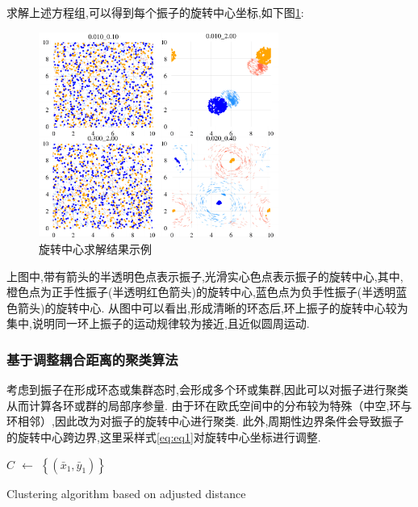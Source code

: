 \documentclass{article}
\begin{document}
求解上述方程组,可以得到每个振子的旋转中心坐标,如下图\ref{fig:fig232.2}:%

\begin{figure}[H]
	\centering
	\includegraphics[width=0.7\textwidth]{./figs/centorsBigGraph_sub.png}
	\vspace{-0.2cm}
	\caption{旋转中心求解结果示例}
	\label{fig:fig232.2}
\end{figure}

上图中,带有箭头的半透明色点表示振子,光滑实心色点表示振子的旋转中心,其中,橙色点为正手性振子(半透明红色箭头)的旋转中心,蓝色点为负手性振子(半透明蓝色箭头)的旋转中心. 从图中可以看出,形成清晰的环态后,环上振子的旋转中心较为集中,说明同一环上振子的运动规律较为接近,且近似圆周运动.



\subsubsection{基于调整耦合距离的聚类算法}\label{clustering}

考虑到振子在形成环态或集群态时,会形成多个环或集群,因此可以对振子进行聚类从而计算各环或群的局部序参量. 由于环在欧氏空间中的分布较为特殊（中空,环与环相邻）,因此改为对振子的旋转中心进行聚类. 此外,周期性边界条件会导致振子的旋转中心跨边界,这里采样式\ref{eq:eq1}对旋转中心坐标进行调整.

\begin{algorithm}

	\BlankLine
	\emph{$C$ $\leftarrow$ $\left\{(\bar{x}_1, \bar{y}_1)\right\}$}\;
	\caption{Clustering algorithm based on adjusted distance}\label{algo_disjdecomp}
\end{algorithm}\DecMargin{1em}
\end{document}

